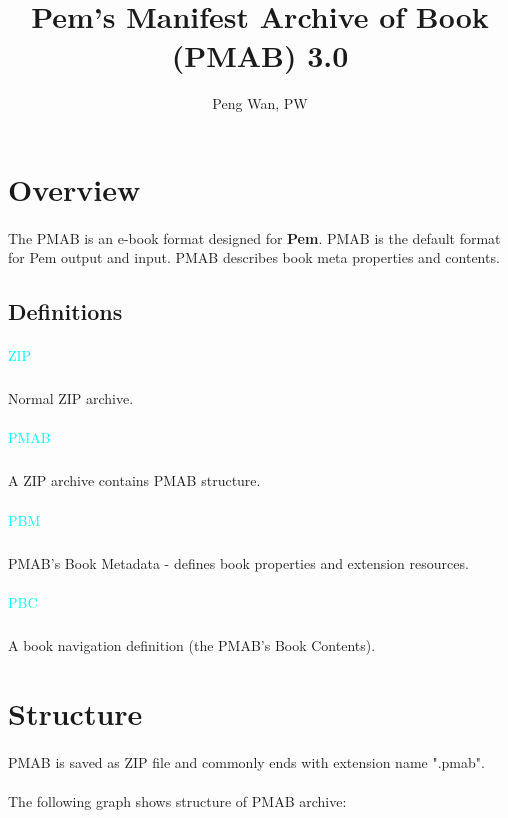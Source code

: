 \documentclass{article}
\title{Pem's Manifest Archive of Book (PMAB) 3.0}
\author{Peng Wan, PW}
\begin{document}
	\maketitle
	\tableofcontents
	\section{Overview}
		\paragraph{} The PMAB is an e-book format designed for \textbf{Pem}. PMAB is the default format for Pem output and input. PMAB describes book meta properties and contents.
		\subsection{Definitions}
			\paragraph{} \textcolor{cyan}{ZIP}
				\subparagraph{} Normal ZIP archive.
			\paragraph{} \textcolor{cyan}{PMAB}
				\subparagraph{} A ZIP archive contains PMAB structure.
			\paragraph{} \textcolor{cyan}{PBM}
				\subparagraph{} PMAB's Book Metadata - defines book properties and extension resources.
			\paragraph{} \textcolor{cyan} {PBC}
				\subparagraph{} A book navigation definition (the PMAB's Book Contents).
	\section{Structure}
		\paragraph{} PMAB is saved as ZIP file and commonly ends with extension name ".pmab".
		\paragraph{} The following graph shows structure of PMAB archive:
			\begin{center}
			\end{center}
\end{document}
